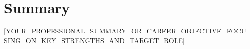 ﻿%
\section{Summary}
\small{[YOUR\_PROFESSIONAL\_SUMMARY\_OR\_CAREER\_OBJECTIVE\_FOCUSING\_ON\_KEY\_STRENGTHS\_AND\_TARGET\_ROLE]}

